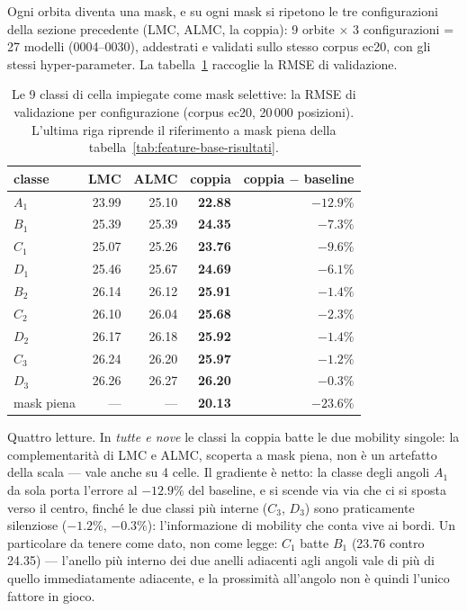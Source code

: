 Ogni orbita diventa una mask, e su ogni mask si ripetono le tre
configurazioni della sezione precedente (LMC, ALMC, la coppia): 9
orbite $\times$ 3 configurazioni = 27 modelli (0004--0030), addestrati
e validati sullo stesso corpus ec20, con gli stessi hyper-parameter. La
tabella~\ref{tab:feature-base-classi} raccoglie la RMSE di
validazione.

\begin{table}[ht]
\centering
\begin{tabular}{lrrrr}
\toprule
classe & LMC & ALMC & coppia & coppia $-$ baseline \\
\midrule
$A_1$ & 23.99 & 25.10 & \textbf{22.88} & $-12.9\%$ \\
$B_1$ & 25.39 & 25.39 & \textbf{24.35} & $-7.3\%$ \\
$C_1$ & 25.07 & 25.26 & \textbf{23.76} & $-9.6\%$ \\
$D_1$ & 25.46 & 25.67 & \textbf{24.69} & $-6.1\%$ \\
$B_2$ & 26.14 & 26.12 & \textbf{25.91} & $-1.4\%$ \\
$C_2$ & 26.10 & 26.04 & \textbf{25.68} & $-2.3\%$ \\
$D_2$ & 26.17 & 26.18 & \textbf{25.92} & $-1.4\%$ \\
$C_3$ & 26.24 & 26.20 & \textbf{25.97} & $-1.2\%$ \\
$D_3$ & 26.26 & 26.27 & \textbf{26.20} & $-0.3\%$ \\
\midrule
mask piena & --- & --- & \textbf{20.13} & $-23.6\%$ \\
\bottomrule
\end{tabular}
\caption{Le 9 classi di cella impiegate come mask selettive: la RMSE di
validazione per configurazione (corpus ec20, 20\,000 posizioni).
L'ultima riga riprende il riferimento a mask piena della
tabella~\ref{tab:feature-base-risultati}.}
\label{tab:feature-base-classi}
\end{table}

Quattro letture. In \emph{tutte e nove} le classi la coppia batte le
due mobility singole: la complementarità di LMC e ALMC, scoperta a mask
piena, non è un artefatto della scala — vale anche su 4 celle. Il
gradiente è netto: la classe degli angoli $A_1$ da sola porta l'errore
al $-12.9\%$ del baseline, e si scende via via che ci si sposta verso
il centro, finché le due classi più interne ($C_3$, $D_3$) sono
praticamente silenziose ($-1.2\%$, $-0.3\%$): l'informazione di
mobility che conta vive ai bordi. Un particolare da tenere come dato,
non come legge: $C_1$ batte $B_1$ (23.76 contro 24.35) — l'anello più
interno dei due anelli adiacenti agli angoli vale di più di quello
immediatamente adiacente, e la prossimità all'angolo non è quindi
l'unico fattore in gioco.

